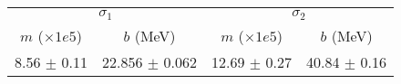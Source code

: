 \begin{tabular}{cc|cc}
\multicolumn{2}{c|}{$\sigma_1$} & \multicolumn{2}{|c}{$\sigma_2$} \\
$m$ ($\times1e5$) & $b$ (MeV) & $m$ ($\times1e5$) & $b$ (MeV) \\
\hline
8.56 $\pm$ 0.11 & 22.856 $\pm$ 0.062 & 12.69 $\pm$ 0.27 & 40.84 $\pm$ 0.16\\
\end{tabular}
